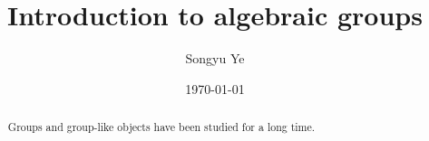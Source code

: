 \documentclass{amsart}
\numberwithin{equation}{section}
\theoremstyle{plain} %
\theoremstyle{definition}
\theoremstyle{remark}
\begin{document}
\title{Introduction to algebraic groups}


\author{Songyu Ye}

\address{}






\date{\today}

\begin{abstract}
    Groups and group-like objects have been studied for a long time.
\end{abstract}


\maketitle




\end{document}
